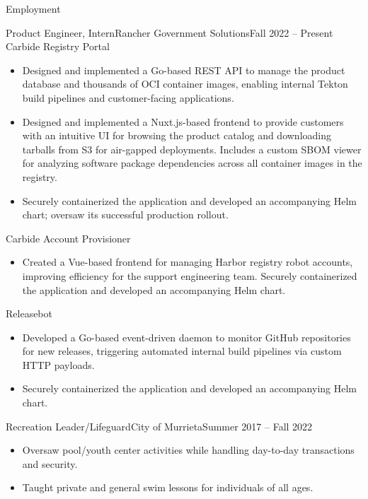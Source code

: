 \documentclass[]{resume}
\begin{document}
	\makeheader
	
	\begin{cvsection}{Employment}
		\begin{cvsubsection}{Product Engineer, Intern}{Rancher Government Solutions}{Fall 2022 -- Present}
			Carbide Registry Portal
			\begin{itemize}
				\item Designed and implemented a Go-based REST API to manage the product database and thousands of OCI container images, enabling internal Tekton build pipelines and customer-facing applications.
				\item Designed and implemented a Nuxt.js-based frontend to provide customers with an intuitive UI for browsing the product catalog and downloading tarballs from S3 for air-gapped deployments. Includes a custom SBOM viewer for analyzing software package dependencies across all container images in the registry.
                \item Securely containerized the application and developed an accompanying Helm chart; oversaw its successful production rollout.
			\end{itemize}
            Carbide Account Provisioner
            \begin{itemize}
                \item Created a Vue-based frontend for managing Harbor registry robot accounts, improving efficiency for the support engineering team. Securely containerized the application and developed an accompanying Helm chart.
            \end{itemize}
			Releasebot
			\begin{itemize}
                \item Developed a Go-based event-driven daemon to monitor GitHub repositories for new releases, triggering \mbox{automated} internal build pipelines via custom HTTP payloads.
                \item Securely containerized the application and developed an accompanying Helm chart.
			\end{itemize}
		\end{cvsubsection}
		
		\begin{cvsubsection}{Recreation Leader/Lifeguard}{City of Murrieta}{Summer 2017 -- Fall 2022}	
			\begin{itemize}
				\item Oversaw pool/youth center activities while handling day-to-day transactions and security.
                \item Taught private and general swim lessons for individuals of all ages.
			\end{itemize}
		\end{cvsubsection}
	\end{cvsection}
	
\end{document}
